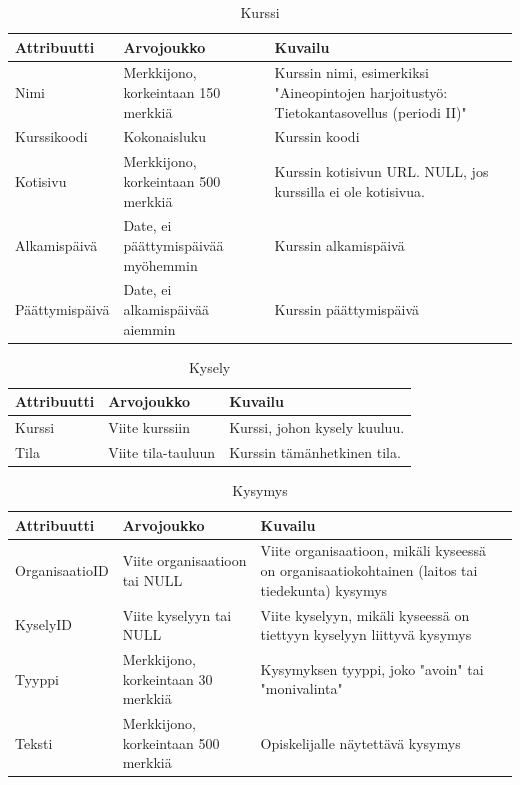 \documentclass[12pt,a4paper,titlepage]{article}
\begin{document}
\begin{table}[h]
\caption{Kurssi}
\begin{tabularx}{\textwidth}{ |  l X X  |}
  \hline
  Attribuutti & Arvojoukko & Kuvailu \\
  \hline
  Nimi & Merkkijono, korkeintaan 150 merkkiä & Kurssin nimi, esimerkiksi "Aineopintojen harjoitustyö: Tietokantasovellus (periodi II)" \\
  Kurssikoodi & Kokonaisluku & Kurssin koodi \\
  Kotisivu & Merkkijono, korkeintaan 500 merkkiä & Kurssin kotisivun URL. NULL, jos kurssilla ei ole kotisivua. \\
  Alkamispäivä & Date, ei päättymispäivää myöhemmin & Kurssin alkamispäivä \\
  Päättymispäivä & Date, ei alkamispäivää aiemmin & Kurssin päättymispäivä \\
  \hline
\end{tabularx}
\end{table}


\begin{table}[h]
\caption{Kysely}
\begin{tabularx}{\textwidth}{ |  l X X  |}
  \hline
  Attribuutti & Arvojoukko & Kuvailu \\
  \hline
  Kurssi & Viite kurssiin & Kurssi, johon kysely kuuluu. \\
  Tila & Viite tila-tauluun & Kurssin tämänhetkinen tila. \\
  \hline
\end{tabularx}
\end{table}

\begin{table}[h]
\caption{Kysymys}
\begin{tabularx}{\textwidth}{ |  l X X  |}
  \hline
  Attribuutti & Arvojoukko & Kuvailu \\
  \hline
  OrganisaatioID & Viite organisaatioon tai NULL & Viite organisaatioon, mikäli kyseessä on organisaatiokohtainen (laitos tai tiedekunta) kysymys \\
  KyselyID & Viite kyselyyn tai NULL & Viite kyselyyn, mikäli kyseessä on tiettyyn kyselyyn liittyvä kysymys \\
  Tyyppi & Merkkijono, korkeintaan 30 merkkiä & Kysymyksen tyyppi, joko "avoin" tai "monivalinta"\\
  Teksti & Merkkijono, korkeintaan 500 merkkiä & Opiskelijalle näytettävä kysymys \\
  \hline
\end{tabularx}
\end{table}
\end{document}
